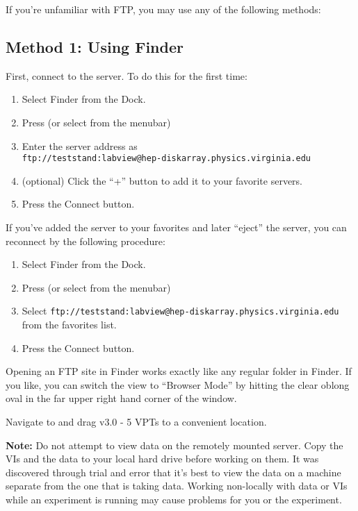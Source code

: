 If you're unfamiliar with FTP, you may use any of the following methods:

\subsection{Method 1: Using Finder}
\label{sec:op_start:vptvi:finder}

First, connect to the server.  To do this for the first time:
\begin{enumerate}
\item Select \textsf{Finder} from the Dock.
\item Press  (or select  from the menubar)
\item Enter the server address as \\
  \texttt{ftp://teststand:labview@hep-diskarray.physics.virginia.edu}
\item (optional) Click the ``+'' button to add it to your favorite servers.
\item Press the \textsf{Connect} button.
\end{enumerate}

If you've added the server to your favorites and later ``eject'' the server, you can reconnect by the following procedure:
\begin{enumerate}
\item Select \textsf{Finder} from the Dock.
\item Press  (or select  from the menubar)
\item Select \texttt{ftp://teststand:labview@hep-diskarray.physics.virginia.edu} from the favorites list.
\item Press the \textsf{Connect} button.
\end{enumerate}

Opening an FTP site in Finder works exactly like any regular folder in Finder.  If you like, you can switch the view to ``Browser Mode'' by hitting the clear oblong oval in the far upper right hand corner of the window.

Navigate to  and drag \textsf{v3.0 - 5 VPTs} to a convenient location.

\textbf{Note:} Do not attempt to view data on the remotely mounted server.  Copy the VIs and the data to your local hard drive before working on them.  It was discovered through trial and error that it's best to view the data on a machine separate from the one that is taking data.  Working non-locally with data or VIs while an experiment is running may cause problems for you or the experiment.

